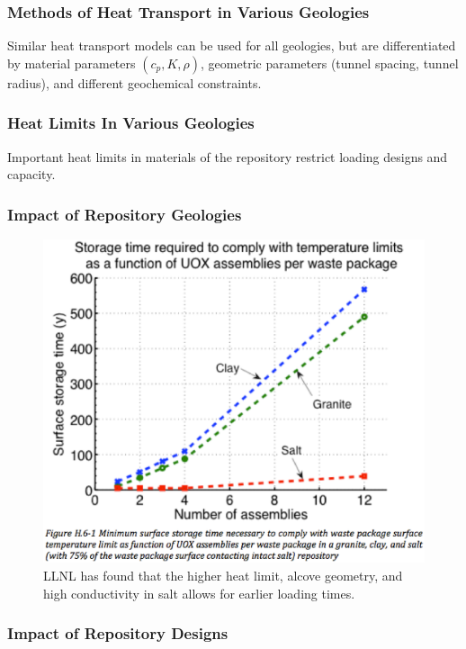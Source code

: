 

\begin{frame}[ctb!]
  \frametitle{Methods of Heat Transport in Various Geologies}
  
  Similar heat transport models can be used for all geologies, but are 
  differentiated by material parameters $(c_p, K, \rho)$, geometric parameters 
  (tunnel spacing, tunnel radius), and different geochemical constraints.
\end{frame}

\begin{frame}[ctb!]
  \frametitle{Heat Limits In Various Geologies}
  Important heat limits in materials of the repository restrict loading designs 
  and capacity.  
  
\end{frame}

 \begin{frame}
   \frametitle{Impact of Repository Geologies}
   \begin{figure}[h!]
     \begin{center}
       \includegraphics[height=.7\textheight]{llnlGeos.eps}
     \end{center}
     \caption{LLNL has found that the higher heat limit, alcove geometry, and 
     high conductivity in salt allows for earlier loading times.}
     \label{fig:llnlGeos}
   \end{figure}
\end{frame}

\begin{frame}[ctb!]
  \frametitle{Impact of Repository Designs}
   
 \end{frame}

